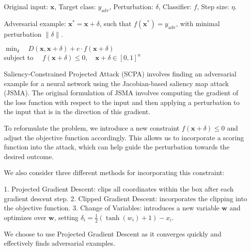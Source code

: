 Original input: $ \mathbf{x} $, \quad Target class: $ y_{\text{adv}} $, \quad Perturbation:  $ \delta $, \quad Classifier: $ f $, \quad Step size: $ \eta $.

Adversarial example: $ \mathbf{x}^* = \mathbf{x} + \delta $, \quad such that $ f(\mathbf{x}^*) = y_{\text{adv}} $, \quad with minimal perturbation $ \|\delta\| $.


   $\min_{\delta} \quad D(\mathbf{x}, \mathbf{x} + \delta) + c \cdot f(\mathbf{x} + \delta)$ \\
    subject to $\quad f(\mathbf{x} + \delta) \leq 0, \quad \mathbf{x} + \delta \in [0,1]^n$

Saliency-Constrained Projected Attack (SCPA) involves finding an adversarial example for a neural network using the Jacobian-based saliency map attack (JSMA). The original formulation of JSMA involves computing the gradient of the loss function with respect to the input and then applying a perturbation to the input that is in the direction of this gradient.

To reformulate the problem, we introduce a new constraint $f(\mathbf{x} + \delta) \leq 0$ and adjust the objective function accordingly. This allows us to incorporate a scoring function into the attack, which can help guide the perturbation towards the desired outcome.

We also consider three different methods for incorporating this constraint:

1. Projected Gradient Descent: clips all coordinates within the box after each gradient descent step.
2. Clipped Gradient Descent: incorporates the clipping into the objective function.
3. Change of Variables: introduces a new variable $\mathbf{w}$ and optimizes over $\mathbf{w}$, setting $\delta_i = \frac{1}{2} (\tanh(w_i) + 1) - x_i$.

We choose to use Projected Gradient Descent as it converges quickly and effectively finds adversarial examples.